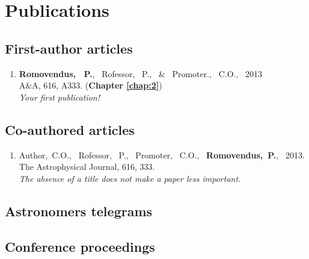 
%
\chapter{Publications}

\section*{First-author articles}
\begin{enumerate}

\item {\bf Romovendus, ~P.}, ~Rofessor, ~P., ~\& ~Promoter., ~C.O., ~2013\\
A\&A, 616, A333. ({\bf Chapter \ref{chap:2}}) \\
\textit{Your first publication!}

\end{enumerate}

\section*{Co-authored articles}
\begin{enumerate}
\item Author,~C.O., ~Rofessor, ~P., ~Promoter, ~C.O., ~{\bf Romovendus,~P.}, ~2013. \\
The Astrophysical Journal, 616, 333.
\\\textit{The absence of a title does not make a paper less important.}

\end{enumerate}

\section*{Astronomers telegrams}

\section*{Conference proceedings}
